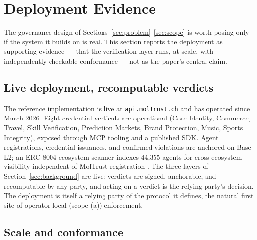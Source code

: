 
\section{Deployment Evidence}
\label{sec:evidence}

The governance design of Sections~\ref{sec:problem}–\ref{sec:scope} is worth posing only if the system it builds on is real. This section reports the deployment as supporting evidence — that the verification layer runs, at scale, with independently checkable conformance — not as the paper's central claim.

\subsection{Live deployment, recomputable verdicts}

The reference implementation is live at \texttt{api.moltrust.ch} and has operated since March 2026. Eight credential verticals are operational (Core Identity, Commerce, Travel, Skill Verification, Prediction Markets, Brand Protection, Music, Sports Integrity), exposed through MCP tooling and a published SDK. Agent registrations, credential issuances, and confirmed violations are anchored on Base L2; an ERC-8004 ecosystem scanner indexes 44{,}355 agents for cross-ecosystem visibility independent of MolTrust registration \cite{ref37_erc8004}. The three layers of Section~\ref{sec:background} are live: verdicts are signed, anchorable, and recomputable by any party, and acting on a verdict is the relying party's decision. The deployment is itself a relying party of the protocol it defines, the natural first site of operator-local (scope (a)) enforcement.

\subsection{Scale and conformance}

